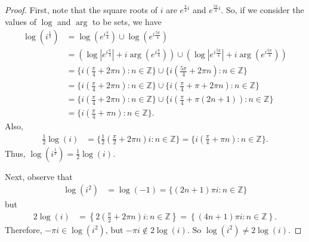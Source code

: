 \documentclass[10pt]{article}
\newcommand{\Z}{\mathbb{Z}}
\begin{document}
\begin{enumerate}
\begin{proof}
First, note that the square roots of $i$ are $e^{\frac{\pi}{4}i}$ and $e^{\frac{5\pi}{4}i}$.  So, if we consider the values of $\log$ and $\arg$ to be sets, we have
\begin{align*}
\log(i^{\frac12})
&= \log(e^{i\frac{\pi}{4}}) \cup \log(e^{i\frac{5\pi}{4}}) \\
&= (\log |e^{i \frac{\pi}{4}}| + i \arg (e^{i \frac{\pi}{4}})) \cup (\log |e^{i \frac{5\pi}{4}}| + i \arg (e^{i \frac{5\pi}{4}})) \\
&= \{i \left(\frac{\pi}{4} + 2\pi n \right) : n \in \Z\} \cup  \{i \left(\frac{5\pi}{4} + 2\pi n \right) : n \in \Z \} \\
&= \{i \left(\frac{\pi}{4} + 2\pi n \right) : n \in \Z\} \cup  \{i \left(\frac{\pi}{4} + \pi + 2\pi n \right) : n \in \Z \} \\
&= \{i \left(\frac{\pi}{4} + 2\pi n \right) : n \in \Z\} \cup  \{i \left(\frac{\pi}{4} + \pi (2n+1) \right) : n \in \Z \} \\
&= \{i \left(\frac{\pi}{4} + \pi n \right) : n \in \Z\}.
\end{align*}
Also,
\begin{align*}
\frac12 \log(i)
&= \{\frac{1}{2} (\frac{\pi}{2} + 2 \pi n)i : n \in \Z \}
= \{i \left(\frac{\pi}{4} + \pi n \right) : n \in \Z\}.
\end{align*}
Thus, $\log(i^{\frac{1}{2}}) = \frac{1}{2}\log(i)$.

Next, observe that
\begin{align*}
\log(i^2) &= \log(-1) = \{(2n+1)\pi i : n \in \Z \}
\end{align*}
but
\begin{align*}
2 \log(i) &= \left\{2 (\frac{\pi}{2} + 2\pi n)i : n \in \Z \right\} = \left\{(4n+1)\pi i : n \in \Z \right\}.
\end{align*}
Therefore, $-\pi i \in \log(i^2)$, but $-\pi i \not \in 2 \log(i)$.  So $\log(i^2) \neq 2 \log(i)$.
\end{proof}


\end{enumerate}
\end{document}
